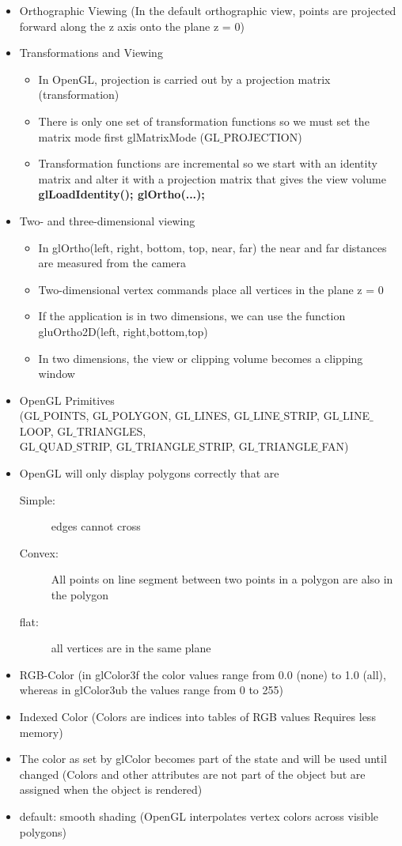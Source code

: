 \documentclass[11pt,a4paper]{article}
\begin{document}
\begin{itemize}
			\item Orthographic Viewing (In the default orthographic view, points are projected forward along the z axis onto the plane z = 0)
			\item Transformations and Viewing
				\begin{itemize}
					\item In OpenGL, projection is carried out by a projection matrix (transformation)	
					\item There is only one set of transformation functions so we must set the matrix mode first glMatrixMode (GL$\_$PROJECTION)	
					\item Transformation functions are incremental so we start with	an identity matrix and alter it with a projection matrix that gives the view volume \textbf{glLoadIdentity(); glOrtho(...);}
				\end{itemize}
			\item Two- and three-dimensional viewing
				\begin{itemize}
					\item In glOrtho(left, right, bottom, top, near, far) the near and far distances are measured from the camera	
					\item Two-dimensional vertex commands place all vertices in the plane z = 0	
					\item If the application is in two dimensions, we can use the function gluOrtho2D(left, right,bottom,top)	
					\item In two dimensions, the view or clipping volume becomes a clipping window
				\end{itemize}
			\item OpenGL Primitives\\
			(GL$\_$POINTS,
			GL$\_$POLYGON,
			GL$\_$LINES,
			GL$\_$LINE$\_$STRIP,
			GL$\_$LINE$\_$LOOP,
			GL$\_$TRIANGLES,\\
			GL$\_$QUAD$\_$STRIP,
			GL$\_$TRIANGLE$\_$STRIP,
			GL$\_$TRIANGLE$\_$FAN)
			\item OpenGL will only display polygons correctly that are	
				\begin{description}
					\item[Simple:] edges cannot cross
					\item[Convex:] All points on line segment between two points in a polygon are also in the polygon	
					\item[flat:] all vertices are in the same plane
				\end{description}
			\item RGB-Color (in glColor3f the color values range from 0.0 (none) to 1.0 (all), whereas in glColor3ub the values range from 0 to 255)
			\item Indexed Color (Colors are indices into tables of RGB values Requires less memory)
			\item The color as set by glColor becomes part of the state and will be used until changed (Colors and other attributes are not part of the object but are assigned when the object is rendered)
			\item default: smooth shading (OpenGL interpolates vertex colors across visible polygons)


\end{itemize}
\end{document}
